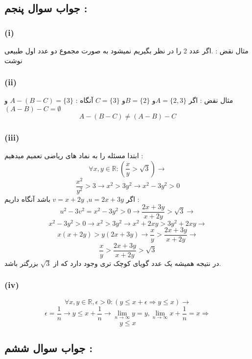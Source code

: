 \documentclass{article}
\begin{document}
		\subsection*{جواب سوال پنجم :}
			\subsubsection*{(i)}
				مثال نقض :
				.اگر عدد 2 را در نظر بگیریم نمیشود به صورت مجموع دو عدد اول طبیعی نوشت

			\subsubsection*{(ii)}
				مثال نقض :
				اگر $A = \{2, 3\}$و $B = \{2\}$و $C = \{3\}$ آنگاه : $A - (B - C) = \{3\}$ و $(A - B) - C = \emptyset$
				\[A - (B - C) \neq (A - B) - C\]
			
			\subsubsection*{(iii)}
				ابتدا مسئله را به نماد های ریاضی تعمیم میدهیم :\\
				\[\forall x, y \in \mathbb{R} : (\frac{x}{y} > \sqrt{3}) \rightarrow\]
				\[
				\frac{x^2}{y^2} > 3 \rightarrow x^2 > 3y^2 \rightarrow x^2 - 3y^2 > 0
				\]
				اگر $u = 2x + 3y$, $v = x + 2y$ باشد آنگاه داریم :\\
				\[u^2 -3v^2 = x^2 - 3y^2 > 0 \rightarrow \frac{2x + 3y}{x + 2y} > \sqrt{3} \rightarrow\]
				\[x^2 - 3y^2 > 0 \rightarrow x^2 > 3y^2 \rightarrow x^2 + 2xy > 3y^2 + 2xy \rightarrow\]
				\[x(x + 2y) > y(2x + 3y) \rightarrow \frac{x}{y} > \frac{2x + 3y}{x + 2y} \rightarrow\]
				\[\frac{x}{y} > \frac{2x + 3y}{x + 2y} > \sqrt{3}\]
				در نتیجه همیشه یک عدد گویای کوچک تری وجود دارد که از $\sqrt{3}$ بزرگتر باشد.

			\subsubsection*{(iv)}
				\[
				\forall x,y \in \mathbb{R}, \epsilon > 0 : (y \leq x + \epsilon \Rightarrow y \leq x) \rightarrow
				\]
				\[
				\epsilon = \frac{1}{n} \rightarrow y \leq x + \frac{1}{n} \rightarrow \lim_{n \to \infty} y = y, 
				\lim_{n \to \infty} x + \frac{1}{n} = x \Rightarrow
				\]
				\[
				y \leq x
				\]
		
		\subsection*{جواب سوال ششم :}
\end{document}
